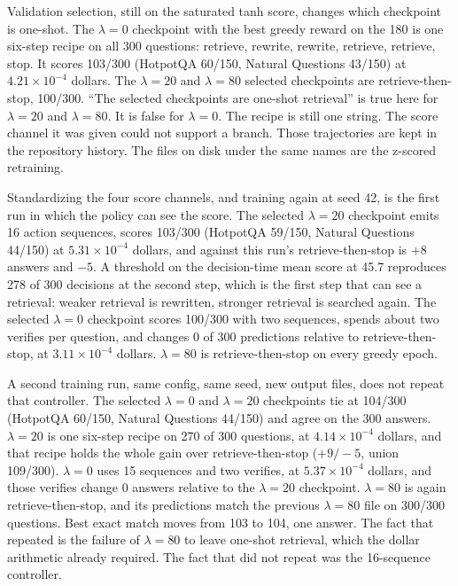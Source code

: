 \documentclass[letterpaper]{article} %
\begin{document}
Validation selection, still on the saturated tanh score, changes which checkpoint is one-shot. The \(\lambda{=}0\) checkpoint with the best greedy reward on the 180 is one six-step recipe on all 300 questions: retrieve, rewrite, rewrite, retrieve, retrieve, stop. It scores 103/300 (HotpotQA 60/150, Natural Questions 43/150) at \(4.21\times 10^{-4}\) dollars. The \(\lambda{=}20\) and \(\lambda{=}80\) selected checkpoints are retrieve-then-stop, 100/300. ``The selected checkpoints are one-shot retrieval'' is true here for \(\lambda{=}20\) and \(\lambda{=}80\). It is false for \(\lambda{=}0\). The recipe is still one string. The score channel it was given could not support a branch. Those trajectories are kept in the repository history. The files on disk under the same names are the z-scored retraining.

Standardizing the four score channels, and training again at seed 42, is the first run in which the policy can see the score. The selected \(\lambda{=}20\) checkpoint emits 16 action sequences, scores 103/300 (HotpotQA 59/150, Natural Questions 44/150) at \(5.31\times 10^{-4}\) dollars, and against this run's retrieve-then-stop is \(+8\) answers and \(-5\). A threshold on the decision-time mean score at 45.7 reproduces 278 of 300 decisions at the second step, which is the first step that can see a retrieval: weaker retrieval is rewritten, stronger retrieval is searched again. The selected \(\lambda{=}0\) checkpoint scores 100/300 with two sequences, spends about two verifies per question, and changes 0 of 300 predictions relative to retrieve-then-stop, at \(3.11\times 10^{-4}\) dollars. \(\lambda{=}80\) is retrieve-then-stop on every greedy epoch.

A second training run, same config, same seed, new output files, does not repeat that controller. The selected \(\lambda{=}0\) and \(\lambda{=}20\) checkpoints tie at 104/300 (HotpotQA 60/150, Natural Questions 44/150) and agree on the 300 answers. \(\lambda{=}20\) is one six-step recipe on 270 of 300 questions, at \(4.14\times 10^{-4}\) dollars, and that recipe holds the whole gain over retrieve-then-stop (\(+9 / -5\), union 109/300). \(\lambda{=}0\) uses 15 sequences and two verifies, at \(5.37\times 10^{-4}\) dollars, and those verifies change 0 answers relative to the \(\lambda{=}20\) checkpoint. \(\lambda{=}80\) is again retrieve-then-stop, and its predictions match the previous \(\lambda{=}80\) file on 300/300 questions. Best exact match moves from 103 to 104, one answer. The fact that repeated is the failure of \(\lambda{=}80\) to leave one-shot retrieval, which the dollar arithmetic already required. The fact that did not repeat was the 16-sequence controller.
\end{document}
